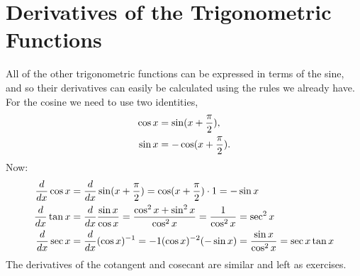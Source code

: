 \section{Derivatives of the Trigonometric Functions}{}{}
\nobreak
All of the other trigonometric functions can be
expressed in terms of the sine, and so their derivatives can easily be
calculated using the rules we already have. For the cosine we need to
use two identities,
\begin{align*}
\cos x &= \sin(x+{\pi\over2}), \\
\sin x &= -\cos(x+{\pi\over2}). \\
\end{align*}
Now:
\begin{align*}
{d\over dx}\cos x &= {d\over dx}\sin(x+{\pi\over2}) =
\cos(x+{\pi\over2})\cdot 1 = -\sin x \\
{d\over dx}\tan x &= {d\over dx}{\sin x\over \cos x}=
{\cos^2 x + \sin^2 x\over \cos^2 x}={1\over \cos^2 x}=\sec^2 x \\
{d\over dx}\sec x &= {d\over dx}(\cos x)^{-1}=
-1(\cos x)^{-2}(-\sin x) = {\sin x \over \cos^2 x} = \sec x\tan x \\
\end{align*}
The derivatives of the cotangent and cosecant are similar and left as
exercises. 

